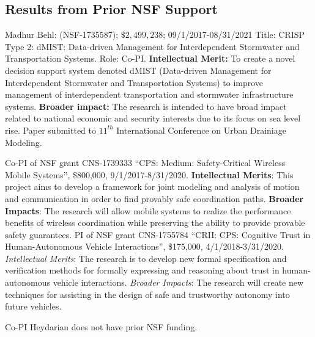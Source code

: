 \subsection{Results from Prior NSF Support}
\label{subsec:prior}

Madhur Behl: (NSF-1735587); $\$2,499,238$; 09/1/2017-08/31/2021 Title: CRISP Type 2: dMIST: Data-driven Management for Interdependent Stormwater and Transportation Systems. Role: Co-PI. \textbf{Intellectual Merit:} To create a novel decision support system denoted dMIST (Data-driven Management for Interdependent Stormwater and Transportation Systems) to improve management of interdependent transportation and stormwater infrastructure systems. %
\textbf{Broader impact:} The research is intended to have broad impact related to national economic and security interests due to its focus on sea level rise. Paper submitted to $11^{th}$ International Conference on Urban Drainiage Modeling. 


Co-PI of NSF grant CNS-1739333 ``CPS: Medium: Safety-Critical Wireless Mobile Systems'', \$800,000, 9/1/2017-8/31/2020. \textbf{Intellectual Merits}: This project aims to develop a framework for joint modeling and analysis of motion and communication in order to find provably safe coordination paths. \textbf{Broader Impacts}: The research will allow mobile systems to realize the performance benefits of wireless coordination while preserving the ability to provide provable safety guarantees. 
PI of NSF grant CNS-1755784 ``CRII: CPS: Cognitive Trust in Human-Autonomous Vehicle Interactions'', \$175,000, 4/1/2018-3/31/2020.
\emph{Intellectual Merits}: The research is to develop new formal specification and verification methods for formally expressing and reasoning about trust in human-autonomous vehicle interactions.
\emph{Broader Impacts}: The research will create new techniques for assisting in the design of safe and trustworthy autonomy into future vehicles.

Co-PI Heydarian does not have prior NSF funding. 
